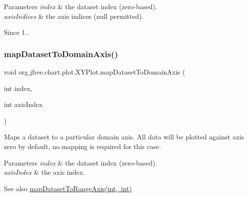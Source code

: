 \begin{DoxyParams}{Parameters}
{\em index} & the dataset index (zero-\/based). \\
\hline
{\em axis\+Indices} & the axis indices ({\ttfamily null} permitted).\\
\hline
\end{DoxyParams}
\begin{DoxySince}{Since}
1.. 
\end{DoxySince}
\mbox{\label{classorg_1_1jfree_1_1chart_1_1plot_1_1_x_y_plot_accf6de4266638c98821ec41ff0e90455}} 
\subsubsection{\texorpdfstring{map\+Dataset\+To\+Domain\+Axis()}{mapDatasetToDomainAxis()}}
{\footnotesize\ttfamily void org.\+jfree.\+chart.\+plot.\+X\+Y\+Plot.\+map\+Dataset\+To\+Domain\+Axis (\begin{DoxyParamCaption}\item[{int}]{index,  }\item[{int}]{axis\+Index }\end{DoxyParamCaption})}

Maps a dataset to a particular domain axis. All data will be plotted against axis zero by default, no mapping is required for this case.


\begin{DoxyParams}{Parameters}
{\em index} & the dataset index (zero-\/based). \\
\hline
{\em axis\+Index} & the axis index.\\
\hline
\end{DoxyParams}
\begin{DoxySeeAlso}{See also}
\mbox{\hyperlink{classorg_1_1jfree_1_1chart_1_1plot_1_1_x_y_plot_a0f3db6eea8441891a6ece35ecded8dd5}{map\+Dataset\+To\+Range\+Axis(int, int)}} 
\end{DoxySeeAlso}
\mbox{\label{classorg_1_1jfree_1_1chart_1_1plot_1_1_x_y_plot_a255d00eae9a02551006220da21a72929}} 
